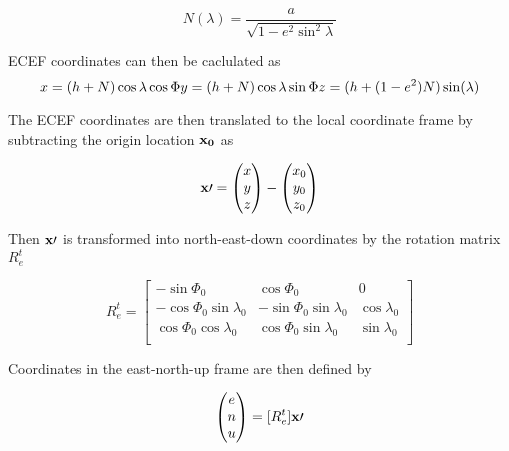 \documentclass{aiaa}
\begin{document}
\begin{equation}
N(\lambda)=\frac{a}{\sqrt{1-e^2\sin^2{\lambda}}}
\end{equation}

ECEF coordinates can then be caclulated as
\begin{equation}
x=(h+N)\cos{\lambda}\cos{\Phi} \\
y=(h+N)\cos{\lambda}\sin{\Phi} \\
z=(h+(1-e^2)N)\sin(\lambda)
\end{equation}

The ECEF coordinates are then translated to the local coordinate frame by subtracting the origin location $\bold{x_0}$ as

\begin{equation}
\bold{x\prime} = 
	\begin{pmatrix}
    	x \\
        y \\ 
        z \\
    \end{pmatrix}
    -
    \begin{pmatrix}
    	x_0 \\
        y_0 \\ 
        z_0 \\
    \end{pmatrix}
\end{equation}
   
   
   Then $\bold{x\prime}$ is transformed into north-east-down coordinates by the rotation matrix $R_e^t$
   
   \begin{equation}
   	R_e^t = 
    	\begin{bmatrix}
        -\sin{\Phi_0} & \cos{\Phi_0} & 0 \\
        -\cos{\Phi_0}\sin{\lambda_0} & -\sin{\Phi_0}\sin{\lambda_0} & \cos{\lambda_0}\\
        \cos{\Phi_0}\cos{\lambda_0} & \cos{\Phi_0}\sin{\lambda_0} & \sin{\lambda_0}\\
        \end{bmatrix}
    \end{equation}
    
    Coordinates in the east-north-up frame are then defined by
    
    \begin{equation}
    \begin{pmatrix}
    	e \\ 
        n \\
        u \\
    \end{pmatrix}
    =[R_e^t]\bold{x\prime}
    \end{equation}
    
\end{document}
